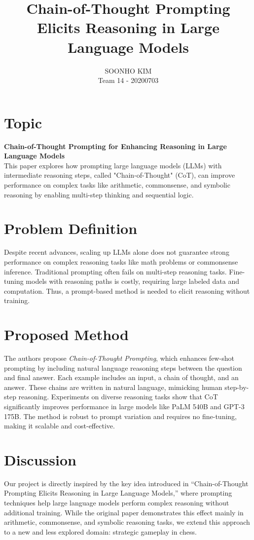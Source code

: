 \documentclass{article}
\title{Chain-of-Thought Prompting Elicits Reasoning in Large Language Models}
\author{%
SOONHO KIM \\
Team 14 - 20200703\\
}
\begin{document}
\maketitle

\section{Topic}
\textbf{Chain-of-Thought Prompting for Enhancing Reasoning in Large Language Models} \\
This paper explores how prompting large language models (LLMs) with intermediate reasoning steps, called "Chain-of-Thought" (CoT), can improve performance on complex tasks like arithmetic, commonsense, and symbolic reasoning by enabling multi-step thinking and sequential logic.

\section{Problem Definition}
Despite recent advances, scaling up LLMs alone does not guarantee strong performance on complex reasoning tasks like math problems or commonsense inference. Traditional prompting often fails on multi-step reasoning tasks. Fine-tuning models with reasoning paths is costly, requiring large labeled data and computation. Thus, a prompt-based method is needed to elicit reasoning without training.

\section{Proposed Method}
The authors propose \textit{Chain-of-Thought Prompting}, which enhances few-shot prompting by including natural language reasoning steps between the question and final answer. Each example includes an input, a chain of thought, and an answer. These chains are written in natural language, mimicking human step-by-step reasoning. Experiments on diverse reasoning tasks show that CoT significantly improves performance in large models like PaLM 540B and GPT-3 175B. The method is robust to prompt variation and requires no fine-tuning, making it scalable and cost-effective.

\section{Discussion}
Our project is directly inspired by the key idea introduced in “Chain-of-Thought Prompting Elicits Reasoning in Large Language Models,” where prompting techniques help large language models perform complex reasoning without additional training. While the original paper demonstrates this effect mainly in arithmetic, commonsense, and symbolic reasoning tasks, we extend this approach to a new and less explored domain: strategic gameplay in chess.
\end{document}
